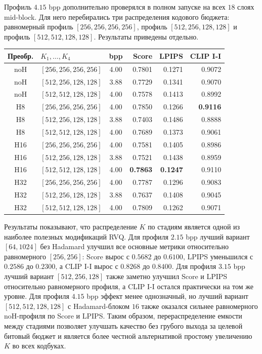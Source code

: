 \documentclass[a4paper,12pt]{article}
\begin{document}
Профиль $4.15$ bpp дополнительно проверялся в полном запуске на всех $18$ слоях mid-block. Для него перебирались три распределения кодового бюджета: равномерный профиль $[256,256,256,256]$, профиль $[512,256,128,128]$ и профиль $[512,512,128,128]$. Результаты приведены отдельно.

\begin{center}
\small
\begin{tabular}{clcrrr}
\hline
Преобр. & $K_1,\ldots,K_4$ & bpp & Score & LPIPS & CLIP I-I \\
\hline
noH & $[256,256,256,256]$ & 4.00 & 0.7801 & 0.1271 & 0.9072 \\
noH & $[512,256,128,128]$ & 3.88 & 0.7729 & 0.1341 & 0.9070 \\
noH & $[512,512,128,128]$ & 4.00 & 0.7578 & 0.1413 & 0.8992 \\
H8  & $[256,256,256,256]$ & 4.00 & 0.7850 & 0.1266 & \textbf{0.9116} \\
H8  & $[512,256,128,128]$ & 3.88 & 0.7403 & 0.1486 & 0.8888 \\
H8  & $[512,512,128,128]$ & 4.00 & 0.7689 & 0.1373 & 0.9061 \\
H16 & $[256,256,256,256]$ & 4.00 & 0.7581 & 0.1405 & 0.8986 \\
H16 & $[512,256,128,128]$ & 3.88 & 0.7521 & 0.1438 & 0.8959 \\
H16 & $[512,512,128,128]$ & 4.00 & \textbf{0.7863} & \textbf{0.1247} & 0.9110 \\
H32 & $[256,256,256,256]$ & 4.00 & 0.7787 & 0.1296 & 0.9083 \\
H32 & $[512,256,128,128]$ & 3.88 & 0.7637 & 0.1408 & 0.9045 \\
H32 & $[512,512,128,128]$ & 4.00 & 0.7809 & 0.1262 & 0.9071 \\
\hline
\end{tabular}
\end{center}

Результаты показывают, что распределение $K$ по стадиям является одной из наиболее полезных модификаций RVQ. Для профиля $2.15$ bpp лучший вариант $[64,1024]$ без Hadamard улучшил все основные метрики относительно равномерного $[256,256]$: Score вырос с $0.5682$ до $0.6100$, LPIPS уменьшился с $0.2586$ до $0.2300$, а CLIP I-I вырос с $0.8268$ до $0.8400$. Для профиля $3.15$ bpp лучший вариант $[512,256,128]$ также заметно улучшил Score и LPIPS относительно равномерного профиля, а CLIP I-I остался практически на том же уровне. Для профиля $4.15$ bpp эффект менее однозначный, но лучший вариант $[512,512,128,128]$ с Hadamard-блоком $16$ также оказался сильнее равномерного noH-профиля по Score и LPIPS. Таким образом, перераспределение емкости между стадиями позволяет улучшать качество без грубого выхода за целевой битовый бюджет и является более честной альтернативой простому увеличению $K$ во всех кодбуках.
\end{document}
